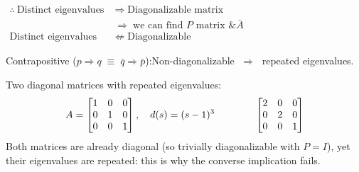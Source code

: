 \begin{keybox}
\noindent\hfil$\displaystyle\begin{aligned}
\therefore\ \text{Distinct eigenvalues} &\;\Rightarrow\; \text{Diagonalizable matrix}\\
&\;\Rightarrow\; \text{we can find $P$ matrix \& $\bar A$}\\[2pt]
\text{Distinct eigenvalues} &\;\not\Leftarrow\; \text{Diagonalizable}
\end{aligned}$\hfil\par\smallskip
Contrapositive ($p\Rightarrow q \;\equiv\; \bar q\Rightarrow \bar p$):\quad Non-diagonalizable $\;\Rightarrow\;$ repeated eigenvalues.
\end{keybox}
Two diagonal matrices with repeated eigenvalues:
\[
A=\begin{bmatrix}1&0&0\\0&1&0\\0&0&1\end{bmatrix},\quad d(s)=(s-1)^3
\qquad\qquad
\begin{bmatrix}2&0&0\\0&2&0\\0&0&1\end{bmatrix}
\]
Both matrices are already diagonal (so trivially diagonalizable with $P=I$), yet their eigenvalues are repeated: this is why the converse implication fails.
